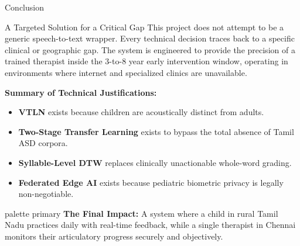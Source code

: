 \documentclass[aspectratio=169, 11pt, xcolor=table]{beamer}
\begin{document}
\begin{frame}{Conclusion}
    \vspace{2mm}
    \begin{block}{A Targeted Solution for a Critical Gap}
        \small
        This project does not attempt to be a generic speech-to-text wrapper. Every technical decision traces back to a specific clinical or geographic gap. The system is engineered to provide the precision of a trained therapist inside the 3-to-8 year early intervention window, operating in environments where internet and specialized clinics are unavailable.
    \end{block}
    
    \vspace{2mm}
    \textbf{Summary of Technical Justifications:}
    \begin{itemize}
        \item \textbf{VTLN} exists because children are acoustically distinct from adults.
        \item \textbf{Two-Stage Transfer Learning} exists to bypass the total absence of Tamil ASD corpora.
        \item \textbf{Syllable-Level DTW} replaces clinically unactionable whole-word grading.
        \item \textbf{Federated Edge AI} exists because pediatric biometric privacy is legally non-negotiable.
    \end{itemize}

    \vspace{2mm}
    \begin{beamercolorbox}[sep=4pt, center, rounded=true]{palette primary}
        \footnotesize \textbf{The Final Impact:} A system where a child in rural Tamil Nadu practices daily with real-time feedback, while a single therapist in Chennai monitors their articulatory progress securely and objectively.
    \end{beamercolorbox}
\end{frame}
\end{document}
